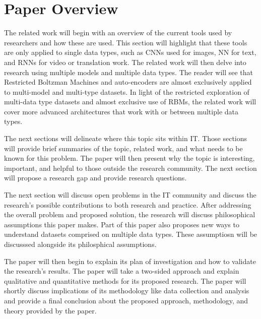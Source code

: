 \chapter{Paper Overview}
The related work will begin with an overview of the current tools used by researchers and how these are used.  This section will highlight that these tools are only applied to single data types, such as CNNs used for images, NN for text, and RNNs for video or translation work.  The related work will then delve into research using multiple models and multiple data types.  The reader will see that Restricted Boltzman Machines and auto-encoders are almost exclusively applied to multi-model and multi-type datasets.  In light of the restricted exploration of multi-data type datasets and almost exclusive use of RBMs, the related work will cover more advanced architectures that work with or between multiple data types.

The next sections will delineate where this topic sits within IT.  Those sections will provide brief summaries of the topic, related work, and what needs to be known for this problem.  The paper will then present why the topic is interesting, important, and helpful to those outside the research community.  The next section will propose a research gap and provide research questions.

The next section will discuss open problems in the IT community and discuss the research's possible contributions to both research and practice.  After addressing the overall problem and proposed solution, the research will discuss philosophical assumptions this paper makes.  Part of this paper also proposes new ways to understand datasets comprised on multiple data types.  These assumptiosn will be discusssed alongside its philosphical assumptions.

The paper will then begin to explain its plan of investigation and how to validate the research's results.  The paper will take a two-sided approach and explain qualitative and quantitative methods for its proposed research.  The paper will shortly discuss implications of its methodology like data collection and analysis and provide a final conclusion about the proposed approach, methodology, and theory provided by the paper.
